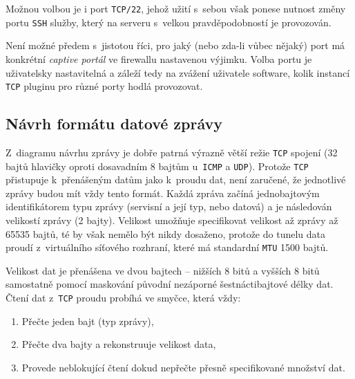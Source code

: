 \documentclass[thesis=M,czech]{FITthesis}[2012/10/20]
\begin{document}
    Možnou volbou je i port \texttt{TCP/22}, jehož užití s~sebou však ponese nutnost změny portu \texttt{SSH} služby, který na serveru s~velkou pravděpodobností je provozován.
    
    Není možné předem s~jistotou říci, pro jaký (nebo zda-li vůbec nějaký) port má konkrétní \textit{captive portál} ve firewallu nastavenou výjimku. Volba portu je uživatelsky nastavitelná a záleží tedy na zvážení uživatele software, kolik instancí \texttt{TCP} pluginu pro různé porty hodlá provozovat.
    
    \subsection{Návrh formátu datové zprávy}
    
    Z~diagramu návrhu zprávy je dobře patrná výrazně větší režie \texttt{TCP} spojení (32 bajtů hlavičky oproti dosavadním 8 bajtům u~\texttt{ICMP} a \texttt{UDP}). Protože \texttt{TCP} přistupuje k~přenášeným datům jako k~proudu dat, není zaručené, že jednotlivé zprávy budou mít vždy tento formát. Každá zpráva začíná jednobajtovým identifikátorem typu zprávy (servisní a její typ, nebo datová) a je následován velikostí zprávy (2 bajty). Velikost umožňuje specifikovat velikost až zprávy až 65535 bajtů, té by však nemělo být nikdy dosaženo, protože do tunelu data proudí z~virtuálního síťového rozhraní, které má standardní \texttt{MTU} 1500 bajtů.
    
    Velikost dat je přenášena ve dvou bajtech -- nižších 8 bitů a vyšších 8 bitů samostatně pomocí maskování původní nezáporné šestnáctibajtové délky dat. Čtení dat z~\texttt{TCP} proudu probíhá ve smyčce, která vždy:
    \begin{enumerate}
     \item Přečte jeden bajt (typ zprávy),
     \item Přečte dva bajty a rekonstruuje velikost data,
     \item Provede neblokující čtení dokud nepřečte přesně specifikované množství dat.
    \end{enumerate}
    
    
    
\end{document}

